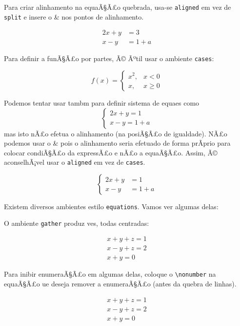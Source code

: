 \documentclass[12pt,a4paper]{article}
\begin{document}
Para criar alinhamento na equaÃ§Ã£o quebrada, usa-se 
\verb|aligned| em vez de \verb|split| e insere o \& nos pontos de alinhamento.

\begin{equation}
\begin{aligned}
2x+y&=3 \\
x-y&=1+a
\end{aligned}
\end{equation}


Para definir a funÃ§Ã£o por partes, Ã© Ãºtil usar o ambiente \verb+cases+:

\[
f(x) = 
  \begin{cases}
      x^2, & x<0 \\
      x, & x \geq 0 
  \end{cases}
\]

Podemos tentar usar tambm para definir sistema de equaes como
\begin{equation}
  \begin{cases}
      2x+y=1 \\
      x-y=1+a 
  \end{cases}
\end{equation}
mas isto nÃ£o efetua o alinhamento (na posiÃ§Ã£o de igualdade). 
NÃ£o podemos usar o  \& pois o alinhamento seria efetuado de forma 
prÃprio para colocar condiÃ§Ã£o da expressÃ£o e nÃ£o a equaÃ§Ã£o.
Assim, Ã© aconselhÃ¡vel usar o \verb+aligned+ em vez de \texttt{cases}.

\begin{equation}
  \left\{ \begin{aligned}
      2x+y&=1 \\
      x-y&=1+a 
  \end{aligned} \right.
\end{equation}

Existem diversos ambientes estilo \texttt{equations}. 
Vamos ver algumas delas:

O ambiente \texttt{gather} produz ves, todas centradas:

\begin{gather}
x+y+z=1 \\
x-y+z=2 \\
x+y=0
\end{gather}

Para inibir enumeraÃ§Ã£o em algumas delas, coloque o \verb|\nonumber| na equaÃ§Ã£o
ue deseja remover a enumeraÃ§Ã£o (antes da quebra de linhas).

\begin{gather}
x+y+z=1 \\
x-y+z=2 \nonumber \\
x+y=0
\end{gather}
\end{document}
